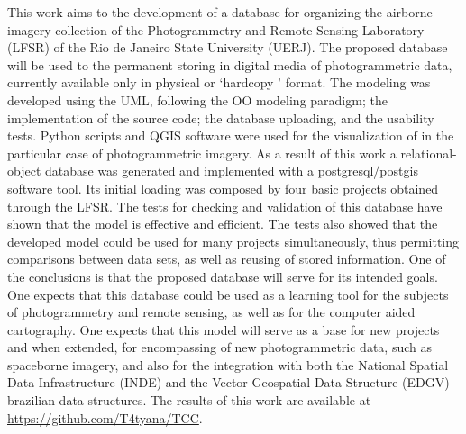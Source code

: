 
\doreference

This work aims to the development of a database for organizing the airborne imagery collection of the Photogrammetry and Remote Sensing Laboratory (LFSR) of the Rio de Janeiro State University (UERJ).
The proposed database will be used to the permanent storing in digital media of photogrammetric data, currently available only in physical or `hardcopy ' format. 
The modeling was developed using the UML, following the OO modeling paradigm; the implementation of the source code; the database uploading, and the usability tests. Python scripts and QGIS software were used for the visualization of in the particular case of photogrammetric imagery.
As a result of this work a relational-object database was generated and implemented with a postgresql/postgis software tool. Its initial loading was composed by four basic projects obtained through the LFSR. The tests for checking and validation of this database have shown that the model is effective and efficient. The tests also showed that the developed model could be used for many projects simultaneously, thus permitting comparisons between data sets, as well as reusing of stored information. 
One of the conclusions is that the proposed database will serve for its intended goals.
One expects that this database could be used as a learning tool for the subjects of photogrammetry and remote sensing, as well as for the computer aided cartography.
One expects that this model will serve as a base for new projects and when extended, for encompassing of new photogrammetric data, such as spaceborne imagery, and also for the integration with both the National Spatial Data Infrastructure (INDE) and the Vector Geospatial Data Structure (EDGV) brazilian data structures.
The results of this work are available at \url{https://github.com/T4tyana/TCC}.












\printkeys